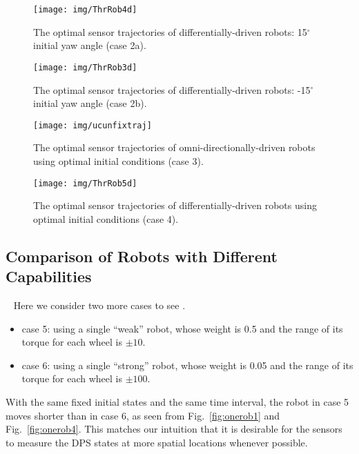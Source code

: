 \begin{figure}
    \centering
  \texttt{[image: img/ThrRob4d]}\\
  \caption{The optimal sensor trajectories of differentially-driven robots: 15$^\circ$ initial yaw angle  (case 2a).}\label{fig:thrrob4d}
\end{figure}


\begin{figure}
    \centering
  \texttt{[image: img/ThrRob3d]}\\
  \caption{The optimal sensor trajectories of differentially-driven robots: -15$^\circ$ initial yaw angle  (case 2b).}\label{fig:thrrob3d}
\end{figure}


\begin{figure}
    \centering
  \texttt{[image: img/ucunfixtraj]}\\
  \caption{The optimal sensor trajectories of omni-directionally-driven robots using optimal initial conditions  (case 3).}\label{fig:ucunfix}
\end{figure}


\begin{figure}
    \centering
  \texttt{[image: img/ThrRob5d]}\\
  \caption{The optimal sensor trajectories of differentially-driven robots  using   optimal initial conditions (case 4).  }\label{fig:thrrob5d}
\end{figure}



\subsection{Comparison of Robots with Different Capabilities}~\label{s:per}
Here we consider two more cases to see .
    \begin{itemize}
        \item case 5: using a single ``weak'' robot, whose weight is 0.5 and the range of its torque for each wheel is $\pm10$.
        \item case 6: using a single ``strong'' robot, whose weight is 0.05 and the range of its torque for each wheel is $\pm100$.
       \end{itemize}
    With the same fixed initial states and the same time interval, the robot in case 5 moves shorter than in case 6, as seen from    Fig.~\ref{fig:onerob1} and Fig.~\ref{fig:onerob4}. This matches our intuition that it is desirable for the sensors to measure the DPS states at more spatial locations whenever possible.

